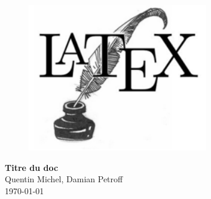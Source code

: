 \documentclass[a4paper,10pt,openany,oneside]{report}
\begin{document}
\begin{figure}
\centering
\vspace*{1cm}
\includegraphics[width=0.7\textwidth]{img/example2.png}
\end{figure}
\vspace*{3cm}
\begin{center}
\textbf{\Huge{Titre du doc}} \\[1cm]
{\Large Quentin Michel, Damian Petroff} \\[5cm]
\today
\end{center}
\end{document}
